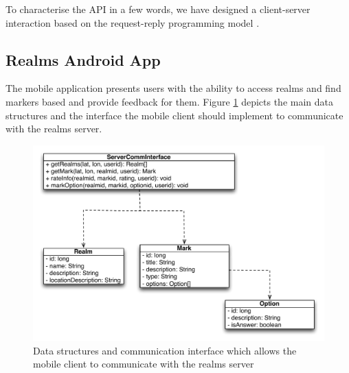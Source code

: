 \noindent To characterise the API in a few words, we have designed a client-server interaction based on the request-reply programming model \cite{Coulouris:2005}.

\subsection{Realms Android App} %
\label{sub:realms_android_app}
The mobile application presents users with the ability to access realms and find markers based and provide feedback for them. Figure \ref{fig.design.mobile_client} depicts the main data structures and the interface the mobile client should implement to communicate with the realms server.
\begin{figure}[H]
	\centering
	\includegraphics[width=1.0\linewidth]{fig/mobile_client}
	\caption{Data structures and communication interface which allows the mobile client to communicate with the realms server}
	\label{fig.design.mobile_client}
\end{figure}

